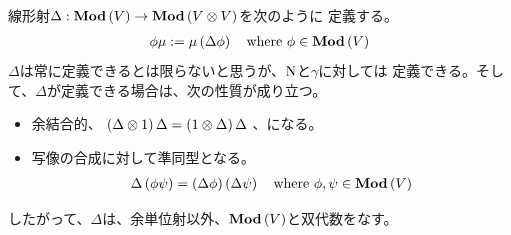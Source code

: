 {	線形射$\Delta:{\mathbf{Mod}}\mathinner{({V})}\to{\mathbf{Mod}}\mathinner{({V\otimes V})}$を次のように
	定義する。
	\begin{equation*}\begin{split}
		\phi\mu := \mu\mathinner{({\Delta\phi})} \quad\text{where }\phi\in{\mathbf{Mod}}\mathinner{({V})}
	\end{split}\end{equation*}
	$\Delta$は常に定義できるとは限らないと思うが、${\mathinner{\operatorname{N}}}$と$\gamma$に対しては
	定義できる。そして、$\Delta$が定義できる場合は、次の性質が成り立つ。
	\begin{itemize}\setlength{\itemsep}{-1mm} %
		\item 余結合的、
		$\mathinner{({\Delta\otimes1})}\Delta = \mathinner{({1\otimes\Delta})}\Delta$ 、になる。
		\item 写像の合成に対して準同型となる。
		\begin{equation*}\begin{split}
			\Delta\mathinner{({\phi\psi})} = \mathinner{({\Delta\phi})}\mathinner{({\Delta\psi})}
			\quad\text{where }\phi,\psi\in{\mathbf{Mod}}\mathinner{({V})}
		\end{split}\end{equation*}
	\end{itemize} %
	したがって、$\Delta$は、余単位射以外、${\mathbf{Mod}}\mathinner{({V})}$と双代数をなす。

}
